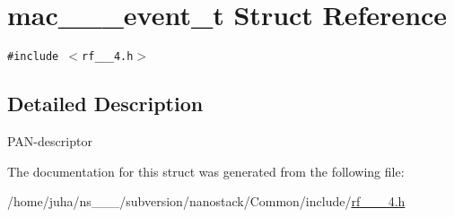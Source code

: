 \hypertarget{structmac__15__4__event__t}{
\section{mac\_\_\_\-event\_\-t Struct Reference}
\label{structmac__15__4__event__t}
}
{\tt \#include $<$rf\_\_\_\-4.h$>$}



\subsection{Detailed Description}
PAN-descriptor 



The documentation for this struct was generated from the following file:\begin{CompactItemize}
\item 
/home/juha/ns\_\_\_/subversion/nanostack/Common/include/\hyperlink{rf__802__15__4_8h}{rf\_\_\_\-4.h}\end{CompactItemize}
